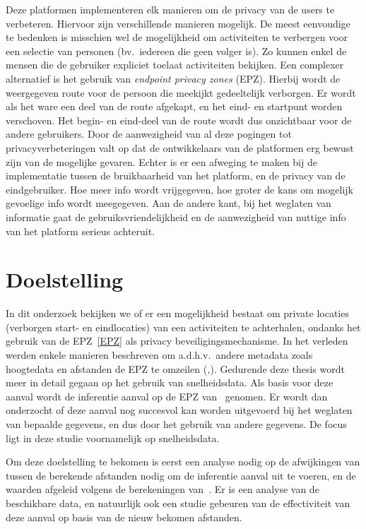 Deze platformen implementeren elk manieren om de privacy van de users te
verbeteren. Hiervoor zijn verschillende manieren mogelijk. De meest eenvoudige
te bedenken is misschien wel de mogelijkheid om activiteiten te verbergen voor
een selectie van personen (bv.\ iedereen die geen volger is). Zo kunnen enkel
de mensen die de gebruiker expliciet toelaat activiteiten bekijken. Een
complexer alternatief is het gebruik van \textit{endpoint privacy zones} (EPZ).
Hierbij wordt de weergegeven route voor de persoon die meekijkt gedeeltelijk
verborgen. Er wordt als het ware een deel van de route afgekapt, en het eind-
en startpunt worden verschoven. Het begin- en eind-deel van de route wordt dus
onzichtbaar voor de andere gebruikers. Door de aanwezigheid van al deze
pogingen tot privacyverbeteringen valt op dat de ontwikkelaars van de
platformen erg bewust zijn van de mogelijke gevaren. Echter is er een afweging
te maken bij de implementatie tussen de bruikbaarheid van het platform, en de
privacy van de eindgebruiker. Hoe meer info wordt vrijgegeven, hoe groter de
kans om mogelijk gevoelige info wordt meegegeven. Aan de andere kant, bij het
weglaten van informatie gaat de gebruiksvriendelijkheid en de aanwezigheid van
nuttige info van het platform serieus achteruit.

\section{Doelstelling}
In dit onderzoek bekijken we of er een mogelijkheid bestaat om private locaties
(verborgen start- en eindlocaties) van een activiteiten te achterhalen, ondanks
het gebruik van de EPZ~\ref{EPZ} als privacy beveiligingsmechanisme. In het
verleden werden enkele manieren beschreven om a.d.h.v.\ andere metadata zoals
hoogtedata en afstanden de EPZ te omzeilen
(\textit{\cite{Dhondt_Pochat_Voulimeneas_Joosen_Volckaert_2022},\cite{Verdonck_2022}}).
Gedurende deze thesis wordt meer in detail gegaan op het gebruik van
snelheidsdata. Als basis voor deze aanval wordt de inferentie aanval op de EPZ
van~\citeauthor{Dhondt_Pochat_Voulimeneas_Joosen_Volckaert_2022} genomen. Er
wordt dan onderzocht of deze aanval nog succesvol kan worden uitgevoerd bij het
weglaten van bepaalde gegevens, en dus door het gebruik van andere gegevens. De
focus ligt in deze studie voornamelijk op snelheidsdata.

Om deze doelstelling te bekomen is eerst een analyse nodig op de afwijkingen
van tussen de berekende afstanden nodig om de inferentie aanval uit te voeren,
en de waarden afgeleid volgens de berekeningen
van~\citeauthor{Dhondt_Pochat_Voulimeneas_Joosen_Volckaert_2022}. Er is een
analyse van de beschikbare data, en natuurlijk ook een studie gebeuren van de
effectiviteit van deze aanval op basis van de nieuw bekomen afstanden.

